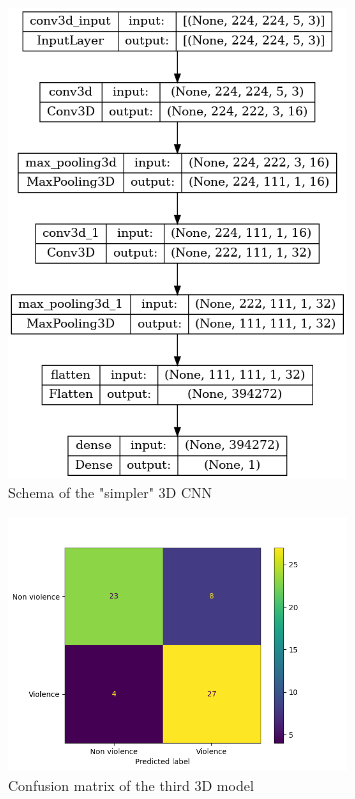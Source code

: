 \begin{figure}[]
    \centering
    \includegraphics[width=0.8\textwidth, height=0.6\textwidth, keepaspectratio]{images/3D9CNNschema.png}
    \caption{Schema of the "simpler" 3D CNN}
    \label{fig:3D3CNNschema}
\end{figure}


\begin{figure}[]
    \centering
    \includegraphics[width=0.8\textwidth]{images/71d5-testGiacomo3D3-9fcf-conf_matrix.png}
    \caption{Confusion matrix of the third 3D model}
    \label{fig:Third3DCNNconfusionMatrix}
\end{figure}



